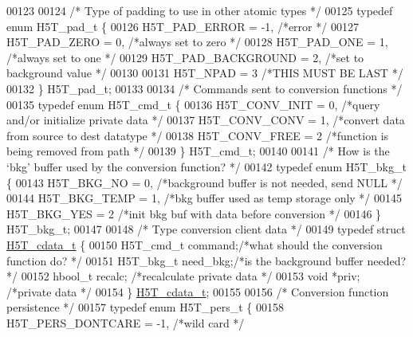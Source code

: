 \begin{DoxyCode}
00123 
00124 \textcolor{comment}{/* Type of padding to use in other atomic types */}
00125 \textcolor{keyword}{typedef} \textcolor{keyword}{enum} H5T\_pad\_t \{
00126     H5T\_PAD\_ERROR        = -1,  \textcolor{comment}{/*error                                      */}
00127     H5T\_PAD\_ZERO         = 0,   \textcolor{comment}{/*always set to zero                         */}
00128     H5T\_PAD\_ONE          = 1,   \textcolor{comment}{/*always set to one                          */}
00129     H5T\_PAD\_BACKGROUND   = 2,   \textcolor{comment}{/*set to background value                    */}
00130 
00131     H5T\_NPAD             = 3    \textcolor{comment}{/*THIS MUST BE LAST                          */}
00132 \} H5T\_pad\_t;
00133 
00134 \textcolor{comment}{/* Commands sent to conversion functions */}
00135 \textcolor{keyword}{typedef} \textcolor{keyword}{enum} H5T\_cmd\_t \{
00136     H5T\_CONV\_INIT   = 0,    \textcolor{comment}{/*query and/or initialize private data       */}
00137     H5T\_CONV\_CONV   = 1,    \textcolor{comment}{/*convert data from source to dest datatype */}
00138     H5T\_CONV\_FREE   = 2 \textcolor{comment}{/*function is being removed from path        */}
00139 \} H5T\_cmd\_t;
00140 
00141 \textcolor{comment}{/* How is the `bkg' buffer used by the conversion function? */}
00142 \textcolor{keyword}{typedef} \textcolor{keyword}{enum} H5T\_bkg\_t \{
00143     H5T\_BKG\_NO      = 0,    \textcolor{comment}{/*background buffer is not needed, send NULL */}
00144     H5T\_BKG\_TEMP    = 1,    \textcolor{comment}{/*bkg buffer used as temp storage only       */}
00145     H5T\_BKG\_YES     = 2 \textcolor{comment}{/*init bkg buf with data before conversion   */}
00146 \} H5T\_bkg\_t;
00147 
00148 \textcolor{comment}{/* Type conversion client data */}
00149 \textcolor{keyword}{typedef} \textcolor{keyword}{struct }\hyperlink{struct_h5_t__cdata__t}{H5T\_cdata\_t} \{
00150     H5T\_cmd\_t       command;\textcolor{comment}{/*what should the conversion function do?    */}
00151     H5T\_bkg\_t       need\_bkg;\textcolor{comment}{/*is the background buffer needed?      */}
00152     hbool\_t     recalc; \textcolor{comment}{/*recalculate private data           */}
00153     \textcolor{keywordtype}{void}        *priv;  \textcolor{comment}{/*private data                   */}
00154 \} \hyperlink{struct_h5_t__cdata__t}{H5T\_cdata\_t};
00155 
00156 \textcolor{comment}{/* Conversion function persistence */}
00157 \textcolor{keyword}{typedef} \textcolor{keyword}{enum} H5T\_pers\_t \{
00158     H5T\_PERS\_DONTCARE   = -1,   \textcolor{comment}{/*wild card                  */}

\end{DoxyCode}
